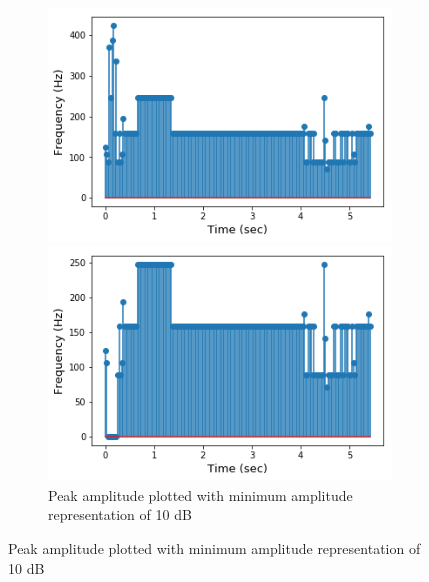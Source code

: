 \begin{figure}[H]
\centering
\begin{subfigure}{0.49\textwidth}
\centering
\includegraphics[width=\textwidth]{figures/peak_detection/20170511_-3.png}
\caption{Peak amplitude plotted with minimum amplitude representation of -3 dB}
\label{fig:freq_-3dB_Amp_pass}

\includegraphics[width=\textwidth]{figures/peak_detection/20170511_10.png}
\caption{Peak amplitude plotted with minimum amplitude representation of 10 dB}
\label{fig:freq_10dB_Amp_pass}


\end{subfigure}
\end{figure}
